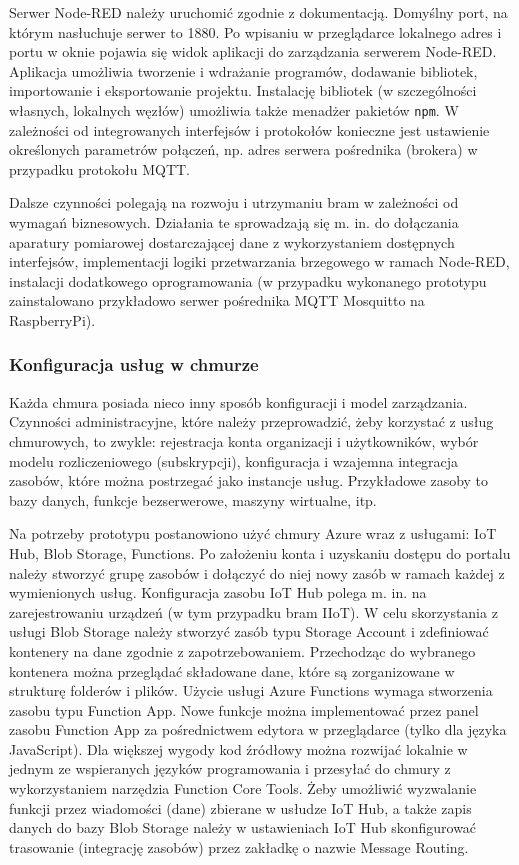 \documentclass[a4paper, 12pt, twoside]{article}
\begin{document}
Serwer Node-RED należy uruchomić zgodnie z dokumentacją. Domyślny port, na
którym nasłuchuje serwer to 1880. Po wpisaniu w przeglądarce lokalnego adres i portu
w oknie pojawia się widok aplikacji do zarządzania serwerem Node-RED. Aplikacja
umożliwia tworzenie i wdrażanie programów, dodawanie bibliotek, importowanie i eksportowanie projektu.
Instalację bibliotek (w szczególności własnych, lokalnych węzłów) umożliwia także menadżer pakietów \texttt{npm}.
W zależności od integrowanych interfejsów i protokołów konieczne jest ustawienie
określonych parametrów połączeń, np. adres serwera pośrednika (brokera) w przypadku protokołu MQTT.

Dalsze czynności polegają na rozwoju i utrzymaniu bram w zależności od wymagań
biznesowych. Działania te sprowadzają się m. in. do dołączania aparatury pomiarowej dostarczającej dane
z wykorzystaniem dostępnych interfejsów, implementacji logiki przetwarzania
brzegowego w ramach Node-RED, instalacji dodatkowego oprogramowania
(w przypadku wykonanego prototypu zainstalowano przykładowo serwer pośrednika MQTT Mosquitto na RaspberryPi).


\subsubsection{Konfiguracja usług w chmurze}

Każda chmura posiada nieco inny sposób konfiguracji i model zarządzania.
Czynności administracyjne, które należy przeprowadzić, żeby korzystać z usług
chmurowych, to zwykle: rejestracja konta organizacji i użytkowników,
wybór modelu rozliczeniowego (subskrypcji), konfiguracja i wzajemna
integracja zasobów, które można postrzegać jako instancje usług. Przykładowe zasoby
to bazy danych, funkcje bezserwerowe, maszyny wirtualne, itp.

Na potrzeby prototypu postanowiono użyć chmury Azure wraz z usługami:
IoT Hub, Blob Storage, Functions. Po założeniu konta i uzyskaniu
dostępu do portalu należy stworzyć grupę zasobów i dołączyć do niej nowy zasób
w ramach każdej z wymienionych usług.
Konfiguracja zasobu IoT Hub polega m. in. na zarejestrowaniu urządzeń (w tym przypadku bram IIoT).
W celu skorzystania z usługi Blob Storage należy stworzyć zasób typu
Storage Account i zdefiniować kontenery na dane zgodnie z zapotrzebowaniem.
Przechodząc do wybranego kontenera można przeglądać składowane dane, które
są zorganizowane w strukturę folderów i plików.
Użycie usługi Azure Functions wymaga stworzenia zasobu typu Function App.
Nowe funkcje można implementować przez panel zasobu Function App za pośrednictwem
edytora w przeglądarce (tylko dla języka JavaScript). Dla większej wygody
kod źródłowy można rozwijać lokalnie w jednym ze wspieranych języków programowania
i przesyłać do chmury z wykorzystaniem narzędzia Function Core Tools.
Żeby umożliwić wyzwalanie funkcji przez wiadomości (dane) zbierane w usłudze IoT Hub,
a także zapis danych do bazy Blob Storage należy w ustawieniach IoT Hub
skonfigurować trasowanie (integrację zasobów) przez zakładkę o nazwie Message Routing.
\end{document}
